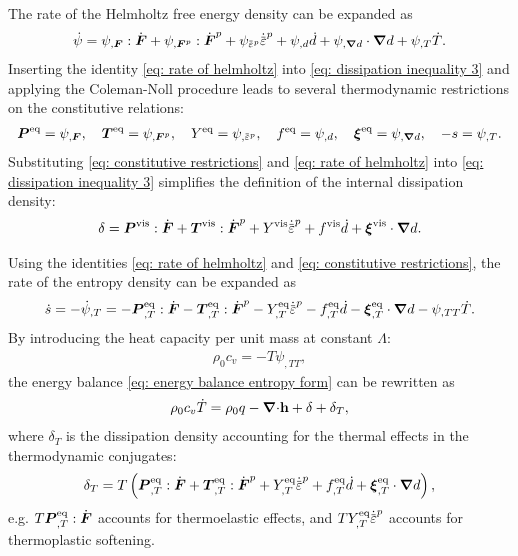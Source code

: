 The rate of the Helmholtz free energy density can be expanded as
\begin{align}
  \dot{\psi} = \psi_{,\defgrad}:\dot{\defgrad} + \psi_{,\defgrad^p}:\dot{\defgrad}^p + \psi_{\ep}\epdot + \psi_{,d}\dot{d} + \psi_{,\grad d}\cdot\grad d + \psi_{,T}\dot{T}. \label{eq: rate of helmholtz}
\end{align}
Inserting the identity \eqref{eq: rate of helmholtz} into \eqref{eq: dissipation inequality 3} and applying the Coleman-Noll procedure leads to several thermodynamic restrictions on the constitutive relations:
\begin{align}
  \bfP^\text{eq} = \psi_{,\defgrad}, \quad \bfT^\text{eq} = \psi_{,\defgrad^p}, \quad Y^\text{eq} = \psi_{,\ep}, \quad f^\text{eq} = \psi_{,d}, \quad \bs{\xi}^\text{eq} = \psi_{,\grad d}, \quad -s = \psi_{,T}. \label{eq: constitutive restrictions}
\end{align}
Substituting \eqref{eq: constitutive restrictions} and \eqref{eq: rate of helmholtz} into \eqref{eq: dissipation inequality 3} simplifies the definition of the internal dissipation density:
\begin{align}
  \delta = \bfP^\text{vis}:\dot{\defgrad} + \bfT^\text{vis}:\dot{\defgrad}^p + Y^\text{vis}\epdot + f^\text{vis}\dot{d} + \bs{\xi}^\text{vis}\cdot\grad d.
\end{align}

Using the identities \eqref{eq: rate of helmholtz} and \eqref{eq: constitutive restrictions}, the rate of the entropy density can be expanded as
\begin{align}
  \dot{s} = -\dot{\psi}_{,T} = - \bfP^\text{eq}_{,T}:\dot{\defgrad} - \bfT^\text{eq}_{,T}:\dot{\defgrad}^p - Y^\text{eq}_{,T}\epdot - f^\text{eq}_{,T}\dot{d} - \bs{\xi}^\text{eq}_{,T}\cdot\grad d - \psi_{,TT} \dot{T}. \label{eq: expanding s dot}
\end{align}
By introducing the heat capacity per unit mass at constant $\Lambda$:
\begin{align}
  \rho_0c_v = -T\psi_{,TT}, \label{eq: heat capacity}
\end{align}
the energy balance \eqref{eq: energy balance entropy form} can be rewritten as
\begin{align}
  \rho_0 c_v \dot{T} = \rho_0 q - {\boldsymbol{\nabla} \cdot} \textbf{h} + \delta + \delta_T, \label{eq: energy balance temperature form}
\end{align}
where $\delta_T$ is the dissipation density accounting for the thermal effects in the thermodynamic conjugates:
\begin{align}
  \delta_T = T\left( \bfP^\text{eq}_{,T}:\dot{\defgrad} + \bfT^\text{eq}_{,T}:\dot{\defgrad}^p + Y^\text{eq}_{,T}\epdot + f^\text{eq}_{,T}\dot{d} + \bs{\xi}^\text{eq}_{,T}\cdot\grad d \right), \label{eq: heat generation due to energetic terms}
\end{align}
e.g. $T\boldsymbol{P}^\text{eq}_{,T}:\dot{\boldsymbol{F}}$ accounts for thermoelastic effects, and $TY^\text{eq}_{,T}\epdot$ accounts for thermoplastic softening.
